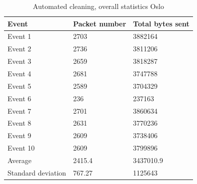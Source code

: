 \begin{table}[H]
\centering
\caption{Automated cleaning, overall statistics Oslo}
\label{tab:ACoverallOSL}
\begin{tabular}{|l|l|l|}
\hline
\textbf{Event} & \textbf{Packet number} & \textbf{Total bytes sent} \\ \hline
Event 1        & 2703                   & 3882164                   \\ \hline
Event 2        & 2736                   & 3811206                   \\ \hline
Event 3        & 2659                   & 3818287                   \\ \hline
Event 4        & 2681                   & 3747788                   \\ \hline
Event 5        & 2589                   & 3704329                   \\ \hline
Event 6        & 236                    & 237163                    \\ \hline
Event 7        & 2701                   & 3860634                   \\ \hline
Event 8        & 2631                   & 3770236                   \\ \hline
Event 9        & 2609                   & 3738406                   \\ \hline
Event 10       & 2609                   & 3799896                   \\ \hline
Average        & 2415.4                 & 3437010.9                 \\ \hline
Standard deviation        & 767.27
       & 1125643               \\ \hline
\end{tabular}
\end{table}

